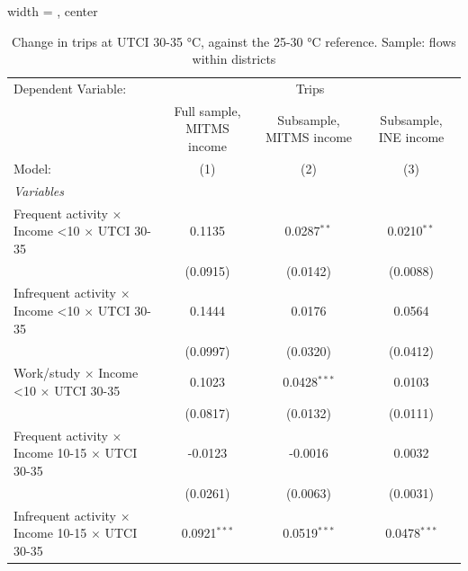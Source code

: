 
\begin{table}[htbp]
   \caption{\label{table_models_abc_30-35} Change in trips at UTCI 30-35 °C, against the 25-30 °C reference. Sample: flows within districts}
   \centering
   \small
   \begin{adjustbox}{width = \textwidth, center}
      \begin{tabular}{lccc}
         \tabularnewline \midrule \midrule
         Dependent Variable: & \multicolumn{3}{c}{Trips}\\
                                                                         & Full sample, MITMS income & Subsample, MITMS income & Subsample, INE income \\   
         Model:                                                          & (1)                       & (2)                     & (3)\\  
         \midrule
         \emph{Variables}\\
         Frequent activity $\times$ Income <10 $\times$ UTCI 30-35       & 0.1135                    & 0.0287$^{**}$           & 0.0210$^{**}$\\   
                                                                         & (0.0915)                  & (0.0142)                & (0.0088)\\   
         Infrequent activity $\times$ Income <10 $\times$ UTCI 30-35     & 0.1444                    & 0.0176                  & 0.0564\\   
                                                                         & (0.0997)                  & (0.0320)                & (0.0412)\\   
         Work/study $\times$ Income <10 $\times$ UTCI 30-35              & 0.1023                    & 0.0428$^{***}$          & 0.0103\\   
                                                                         & (0.0817)                  & (0.0132)                & (0.0111)\\   
         Frequent activity $\times$ Income 10-15 $\times$ UTCI 30-35     & -0.0123                   & -0.0016                 & 0.0032\\   
                                                                         & (0.0261)                  & (0.0063)                & (0.0031)\\   
         Infrequent activity $\times$ Income 10-15 $\times$ UTCI 30-35   & 0.0921$^{***}$            & 0.0519$^{***}$          & 0.0478$^{***}$\\   

\end{tabular}
\end{adjustbox}
\end{table}
